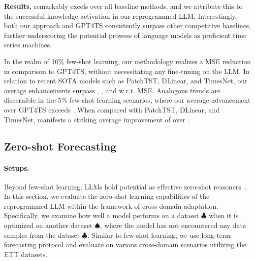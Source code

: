 



\noindent\textbf{Results.}
\method remarkably excels over all baseline methods, and we attribute this to the successful knowledge activation in our reprogrammed LLM. Interestingly, both our approach and GPT4TS consistently surpass other competitive baselines, further underscoring the potential prowess of language models as proficient time series machines.

In the realm of 10\% few-shot learning, our methodology realizes a  MSE reduction in comparison to GPT4TS, without necessitating any fine-tuning on the LLM. In relation to recent SOTA models such as PatchTST, DLinear, and TimesNet, our average enhancements surpass , , and  w.r.t. MSE. Analogous trends are discernible in the 5\% few-shot learning scenarios, where our average advancement over GPT4TS exceeds . When compared with PatchTST, DLinear, and TimesNet, \method manifests a striking average improvement of over .

\subsection{Zero-shot Forecasting}

\paragraph{Setups.} Beyond few-shot learning, LLMs hold potential as effective zero-shot reasoners~\citep{kojima2205large}. In this section, we evaluate the zero-shot learning capabilities of the reprogrammed LLM within the framework of cross-domain adaptation.  Specifically, we examine how well a model performs on a dataset $\clubsuit$ when it is optimized on another dataset $\spadesuit$, where the model has not encountered any data samples from the dataset $\clubsuit$. Similar to few-shot learning, we use long-term forecasting protocol and evaluate on various cross-domain scenarios utilizing the ETT datasets.

